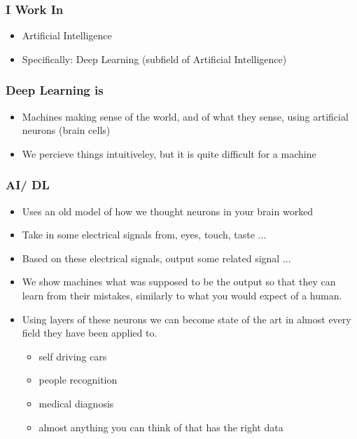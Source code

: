 \documentclass[aspectratio=169]{beamer}
\begin{document}
  \begin{frame}
    \frametitle{I Work In}
    \begin{itemize}
        \item Artificial Intelligence
        \item Specifically: Deep Learning (subfield of Artificial Intelligence)
    \end{itemize}
  \end{frame}

  \begin{frame}
    \frametitle{Deep Learning is}
    \begin{itemize}
        \item Machines making sense of the world, and of what they sense, using artificial neurons (brain cells)
        \item We percieve things intuitiveley, but it is quite difficult for a machine
    \end{itemize}
  \end{frame}

  \begin{frame}
    \frametitle{AI/ DL}
    \begin{itemize}
        \item Uses an old model of how we thought neurons in your brain worked
        \item Take in some electrical signals from, eyes, touch, taste ...
        \item Based on these electrical signals, output some related signal ...
        \item We show machines what was supposed to be the output so that they can learn from their mistakes, similarly to what you would expect of a human.
        \item Using layers of these neurons we can become state of the art in almost every field they have been applied to.
        \begin{itemize}
            \item self driving cars
            \item people recognition
            \item medical diagnosis
            \item almost anything you can think of that has the right data
        \end{itemize}
    \end{itemize}
  \end{frame}
\end{document}
